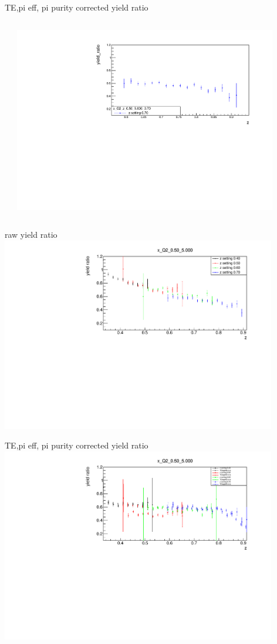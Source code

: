 \begin{frame}{TE,pi eff, pi purity corrected yield ratio}
\begin{columns}
\begin{column}[T]{0.5\textwidth}
\end{column}
\begin{column}[T]{0.5\textwidth}
\includegraphics[width = 0.9\textwidth]{results/yield/statistics_corr/x_Q2_z_0.50_5.000_0.70_ratio.pdf}
\end{column}
\end{columns}
\end{frame}
\begin{frame}{raw yield ratio}
\includegraphics[width = 0.9\textwidth]{results/yield/statistics/x_Q2_0.50_5.000_ratio.pdf}
\end{frame}
\begin{frame}{TE,pi eff, pi purity corrected yield ratio}
\includegraphics[width = 0.9\textwidth]{results/yield/statistics_corr/x_Q2_0.50_5.000_ratio.pdf}
\end{frame}
